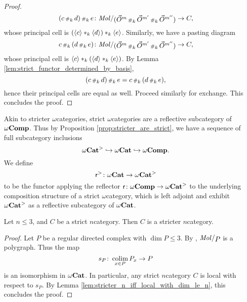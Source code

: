 \begin{proof}
    \begin{equation*}
        (c \cp{k} d) \cp{k} e \colon \molecin{(\dglobe{m} \cp{k} \dglobe{m'} \cp{k} \dglobe{m''})} \to C,
    \end{equation*}
    whose principal cell is \( (\langle c\rangle *_{k} \langle d\rangle) *_{k} \langle e\rangle \).
    Similarly, we have a pasting diagram
    \begin{equation*}
        c \cp{k} (d \cp{k} e) \colon \molecin{(\dglobe{m} \cp{k} \dglobe{m'} \cp{k} \dglobe{m''})} \to C,
    \end{equation*}
    whose principal cell is \( \langle c\rangle *_{k} (\langle d\rangle *_{k} \langle e\rangle) \).
    By Lemma \ref{lem:strict_functor_determined_by_basis}, 
    \begin{equation*}
         (c \,{\scriptstyle\#}_{k}\, d) \,{\scriptstyle\#}_{k}\, e = c \,{\scriptstyle\#}_{k}\, (d \,{\scriptstyle\#}_{k}\, e),
    \end{equation*}
    hence their principal cells are equal as well.
    Proceed similarly for exchange.
    This concludes the proof.
\end{proof} 

Akin to stricter \( \omega \)\nbd categories, strict \( \omega \)\nbd categories are a reflective subcategory of \( \omega\mathbf{Comp} \).
Thus by Proposition \ref{prop:stricter_are_strict}, we have a sequence of full subcategory inclusions
\begin{equation*}
     {\omega\mathbf{Cat}}^> \hookrightarrow {\omega\mathbf{Cat}} \hookrightarrow \omega\mathbf{Comp}.
\end{equation*}
We define
\begin{equation*}
    \mathsf{r}^{>} \colon {\omega\mathbf{Cat}} \to {\omega\mathbf{Cat}}^>
\end{equation*}
to be the functor applying the reflector \( \mathsf{r} \colon \omega\mathbf{Comp} \to {\omega\mathbf{Cat}}^>  \) to the underlying composition structure of a strict \( \omega \)\nbd category, which is left adjoint and exhibit \( {\omega\mathbf{Cat}}^> \) as a reflective subcategory of \( {\omega\mathbf{Cat}} \).


\begin{thm}\label{thm:strict_le_3_are_stricter}
    Let \( n \le 3 \), and \( C \) be a strict \( n \)\nbd category.
    Then \( C \) is a stricter \( n \)\nbd category.
\end{thm}
\begin{proof}
    Let \( P \) be a regular directed complex with \( \dim P \le 3 \).
    By \cite[Corollary 8.4.12]{hadzihasanovic2024combinatorics}, \( \molecin{P} \) is a polygraph.
    Thus the map
    \begin{equation*}
        s_P \colon \operatorname*{colim}_{x \in P} {P}_{x} \to P 
    \end{equation*}
    is an isomorphism in \( {\omega\mathbf{Cat}} \).
    In particular, any strict \( n \)\nbd category \( C \) is local with respect to \( s_P \).
    By Lemma \ref{lem:stricter_n_iff_local_with_dim_le_n}, this concludes the proof.
\end{proof}


